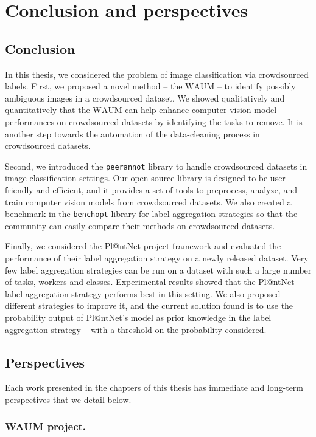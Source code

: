 \chapter{Conclusion and perspectives}

\section{Conclusion}
In this thesis, we considered the problem of image classification via crowdsourced labels.
First, we proposed a novel method -- the $\mathrm{WAUM}$ -- to identify possibly ambiguous images in a crowdsourced dataset.
We showed qualitatively and quantitatively that the $\mathrm{WAUM}$ can help enhance computer vision model performances on crowdsourced datasets by identifying the tasks to remove.
It is another step towards the automation of the data-cleaning process in crowdsourced datasets.

Second, we introduced the \texttt{peerannot} library to handle crowdsourced datasets in image classification settings.
Our open-source library is designed to be user-friendly and efficient, and it provides a set of tools to preprocess, analyze, and train computer vision models from crowdsourced datasets.
We also created a benchmark in the \texttt{benchopt} library for label aggregation strategies so that the community can easily compare their methods on crowdsourced datasets.

Finally, we considered the Pl@ntNet project framework and evaluated the performance of their label aggregation strategy on a newly released dataset.
Very few label aggregation strategies can be run on a dataset with such a large number of tasks, workers and classes.
Experimental results showed that the Pl@ntNet label aggregation strategy performs best in this setting.
We also proposed different strategies to improve it, and the current solution found is to use the probability output of Pl@ntNet's model as prior knowledge in the label aggregation strategy -- with a threshold on the probability considered.

\section{Perspectives}

Each work presented in the chapters of this thesis has immediate and long-term perspectives that we detail below.

\subsection{WAUM project.}

